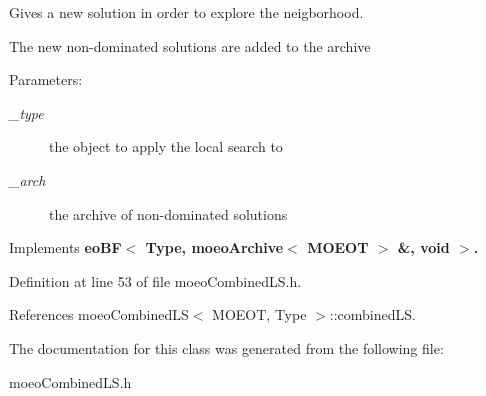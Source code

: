 Gives a new solution in order to explore the neigborhood. 

The new non-dominated solutions are added to the archive \begin{Desc}
\item[Parameters:]
\begin{description}
\item[{\em \_\-type}]the object to apply the local search to \item[{\em \_\-arch}]the archive of non-dominated solutions \end{description}
\end{Desc}


Implements \bf{eo\-BF$<$ Type, moeo\-Archive$<$ MOEOT $>$ \&, void $>$}.

Definition at line 53 of file moeo\-Combined\-LS.h.

References moeo\-Combined\-LS$<$ MOEOT, Type $>$::combined\-LS.

The documentation for this class was generated from the following file:\begin{CompactItemize}
\item 
moeo\-Combined\-LS.h\end{CompactItemize}
